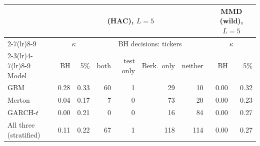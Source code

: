 \begin{tabular}{lrrrrrrrr}
\toprule
 & \multicolumn{6}{c}{\WC{} (HAC), $L=5$} & \multicolumn{2}{c}{MMD (wild), $L=5$} \\
\cmidrule(lr){2-7}\cmidrule(lr){8-9}
 & \multicolumn{2}{c}{$\kappa$} & \multicolumn{4}{c}{BH decisions: tickers} & \multicolumn{2}{c}{$\kappa$} \\
\cmidrule(lr){2-3}\cmidrule(lr){4-7}\cmidrule(lr){8-9}
Model & BH & 5\% & both & test only & Berk.\ only & neither & BH & 5\% \\
\midrule
GBM & 0.28 & 0.33 & 60 & 1 & 29 & 10 & 0.00 & 0.32 \\
Merton & 0.04 & 0.17 & 7 & 0 & 73 & 20 & 0.00 & 0.23 \\
GARCH-$t$ & 0.00 & 0.21 & 0 & 0 & 16 & 84 & 0.00 & 0.27 \\
\addlinespace
All three (stratified) & 0.11 & 0.22 & 67 & 1 & 118 & 114 & 0.00 & 0.27 \\
\bottomrule
\end{tabular}
